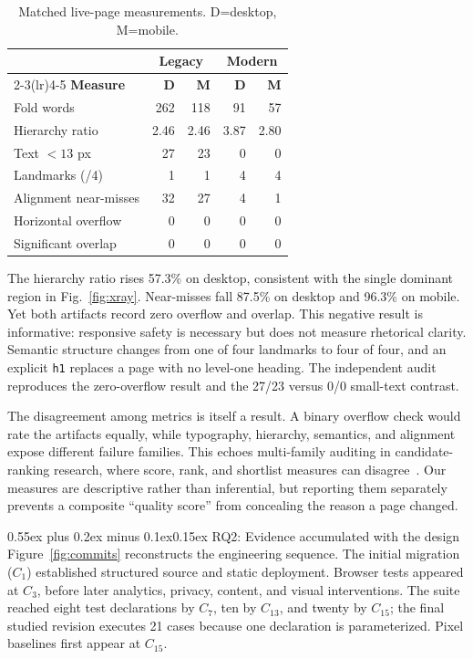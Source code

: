 \documentclass[9pt,twocolumn]{extarticle}
\makeatletter
\renewcommand{\subsection}{\@startsection{subsection}{2}{0pt}%
  {0.55ex plus 0.2ex minus 0.1ex}{0.15ex}%
  {\normalfont\normalsize\bfseries}}
\makeatother
\begin{document}
\begin{table}[ht]
\centering
\caption{Matched live-page measurements. D=desktop, M=mobile.}
\label{tab:results}
\footnotesize
\begin{tabular}{lrrrr}
\toprule
& \multicolumn{2}{c}{Legacy} & \multicolumn{2}{c}{Modern} \\
\cmidrule(lr){2-3}\cmidrule(lr){4-5}
\textbf{Measure} & \textbf{D} & \textbf{M} & \textbf{D} & \textbf{M} \\
\midrule
Fold words & 262 & 118 & 91 & 57 \\
Hierarchy ratio & 2.46 & 2.46 & 3.87 & 2.80 \\
Text $<13$ px & 27 & 23 & 0 & 0 \\
Landmarks (/4) & 1 & 1 & 4 & 4 \\
Alignment near-misses & 32 & 27 & 4 & 1 \\
Horizontal overflow & 0 & 0 & 0 & 0 \\
Significant overlap & 0 & 0 & 0 & 0 \\
\bottomrule
\end{tabular}
\end{table}

The hierarchy ratio rises 57.3\% on desktop, consistent with the single dominant region in Fig.~\ref{fig:xray}. Near-misses fall 87.5\% on desktop and 96.3\% on mobile. Yet both artifacts record zero overflow and overlap. This negative result is informative: responsive safety is necessary but does not measure rhetorical clarity. Semantic structure changes from one of four landmarks to four of four, and an explicit \texttt{h1} replaces a page with no level-one heading. The independent audit reproduces the zero-overflow result and the 27/23 versus 0/0 small-text contrast.

The disagreement among metrics is itself a result. A binary overflow check would rate the artifacts equally, while typography, hierarchy, semantics, and alignment expose different failure families. This echoes multi-family auditing in candidate-ranking research, where score, rank, and shortlist measures can disagree~\cite{yashwant2026}. Our measures are descriptive rather than inferential, but reporting them separately prevents a composite ``quality score'' from concealing the reason a page changed.

\subsection{RQ2: Evidence accumulated with the design}
Figure~\ref{fig:commits} reconstructs the engineering sequence. The initial migration ($C_1$) established structured source and static deployment. Browser tests appeared at $C_3$, before later analytics, privacy, content, and visual interventions. The suite reached eight test declarations by $C_7$, ten by $C_{13}$, and twenty by $C_{15}$; the final studied revision executes 21 cases because one declaration is parameterized. Pixel baselines first appear at $C_{15}$.
\end{document}
